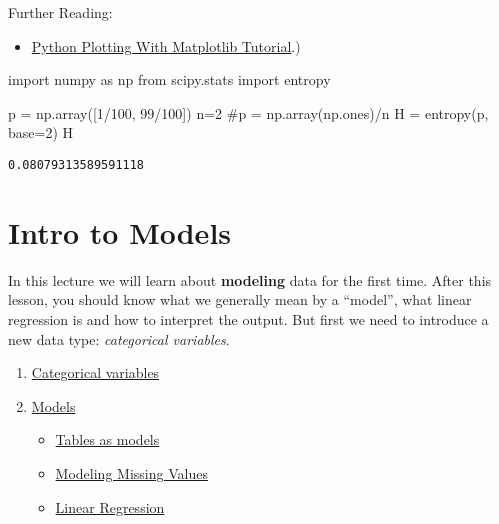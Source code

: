\documentclass[
  letterpaper,
  DIV=11,
  numbers=noendperiod]{scrreprt}
\newenvironment{Shaded}{\begin{snugshade}}{\end{snugshade}}
\newcommand{\CommentTok}[1]{\textcolor[rgb]{0.37,0.37,0.37}{#1}}
\newcommand{\DecValTok}[1]{\textcolor[rgb]{0.68,0.00,0.00}{#1}}
\newcommand{\ImportTok}[1]{\textcolor[rgb]{0.00,0.46,0.62}{#1}}
\newcommand{\NormalTok}[1]{\textcolor[rgb]{0.00,0.23,0.31}{#1}}
\newcommand{\OperatorTok}[1]{\textcolor[rgb]{0.37,0.37,0.37}{#1}}
\providecommand{\tightlist}{%
  \setlength{\itemsep}{0pt}\setlength{\parskip}{0pt}}\usepackage{longtable,booktabs,array}
\begin{document}
Further Reading:

\begin{itemize}
\tightlist
\item
  \href{https://realpython.com/python-matplotlib-guide/\#:~:text=A\%20Figure\%20object\%20is\%20the,\%E2\%80\%9D\%20as\%20we\%20might\%20expect}{Python
  Plotting With Matplotlib Tutorial}.)
\end{itemize}

\begin{Shaded}
\begin{Highlighting}[]
\ImportTok{import}\NormalTok{ numpy }\ImportTok{as}\NormalTok{ np}
\ImportTok{from}\NormalTok{ scipy.stats }\ImportTok{import}\NormalTok{ entropy}

\NormalTok{p }\OperatorTok{=}\NormalTok{ np.array([}\DecValTok{1}\OperatorTok{/}\DecValTok{100}\NormalTok{, }\DecValTok{99}\OperatorTok{/}\DecValTok{100}\NormalTok{])}
\NormalTok{n}\OperatorTok{=}\DecValTok{2}
\CommentTok{\#p = np.array(np.ones)/n}
\NormalTok{H }\OperatorTok{=}\NormalTok{ entropy(p, base}\OperatorTok{=}\DecValTok{2}\NormalTok{)}
\NormalTok{H}
\end{Highlighting}
\end{Shaded}

\begin{verbatim}
0.08079313589591118
\end{verbatim}


\hypertarget{intro-to-models}{%
\chapter{Intro to Models}\label{intro-to-models}}

In this lecture we will learn about \textbf{modeling} data for the first
time. After this lesson, you should know what we generally mean by a
``model'', what linear regression is and how to interpret the output.
But first we need to introduce a new data type: \emph{categorical
variables}.

\begin{enumerate}
\def\labelenumi{\arabic{enumi}.}
\tightlist
\item
  \protect\hyperlink{Categorical-variables}{Categorical variables}
\item
  \protect\hyperlink{Models}{Models}

  \begin{itemize}
  \tightlist
  \item
    \protect\hyperlink{Tables-as-models}{Tables as models}
  \item
    \protect\hyperlink{Modeling-Missing-Values}{Modeling Missing Values}
  \item
    \protect\hyperlink{Linear-Regression}{Linear Regression}
  \end{itemize}
\end{enumerate}
\end{document}
